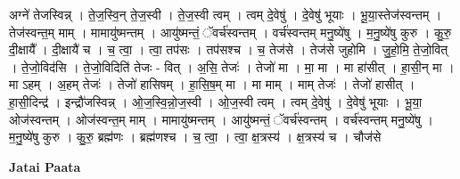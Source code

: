 \documentclass[17pt]{extarticle}
\begin{document}
अग्ने॑ तेजस्विन्न् । ते॒ज॒स्वि॒न् ते॒ज॒स्वी । ते॒ज॒स्वी त्वम् । त्वम् दे॒वेषु॑ । दे॒वेषु॑ भूयाः । भू॒या॒स्तेज॑स्वन्तम् । तेज॑स्वन्त॒म् माम् । मामायु॑ष्मन्तम् । आयु॑ष्मन्तं॒ ॅवर्च॑स्वन्तम् । वर्च॑स्वन्तम् मनु॒ष्ये॑षु । म॒नु॒ष्ये॑षु कुरु । कु॒रु॒ दी॒क्षायै᳚ । दी॒क्षायै॑ च । च॒ त्वा॒ । त्वा॒ तप॑सः । तप॑सश्च । च॒ तेज॑से । तेज॑से जुहोमि । जु॒हो॒मि॒ ते॒जो॒वित् । ते॒जो॒विद॑सि । ते॒जो॒विदिति॑ तेजः - वित् । अ॒सि॒ तेजः॑ । तेजो॑ मा । मा॒ मा । मा हा॑सीत् । हा॒सी॒न् मा । मा ऽहम् । अ॒हम् तेजः॑ । तेजो॑ हासिषम् । हा॒सि॒ष॒म् मा । मा माम् । माम् तेजः॑ । तेजो॑ हासीत् । हा॒सी॒दिन्द्र॑ । इन्द्रौ॑जस्विन्न् । ओ॒ज॒स्वि॒न्नो॒ज॒स्वी । ओ॒ज॒स्वी त्वम् । त्वम् दे॒वेषु॑ । दे॒वेषु॑ भूयाः । भू॒या॒ ओज॑स्वन्तम् । ओज॑स्वन्त॒म् माम् । मामायु॑ष्मन्तम् । आयु॑ष्मन्तं॒ ॅवर्च॑स्वन्तम् । वर्च॑स्वन्तम् मनु॒ष्ये॑षु । म॒नु॒ष्ये॑षु कुरु । कु॒रु॒ ब्रह्म॑णः । ब्रह्म॑णश्च । च॒ त्वा॒ । त्वा॒ क्ष॒त्रस्य॑ । क्ष॒त्रस्य॑ च । चौज॑से \newline

\textbf{Jatai Paata} \newline
\end{document}
